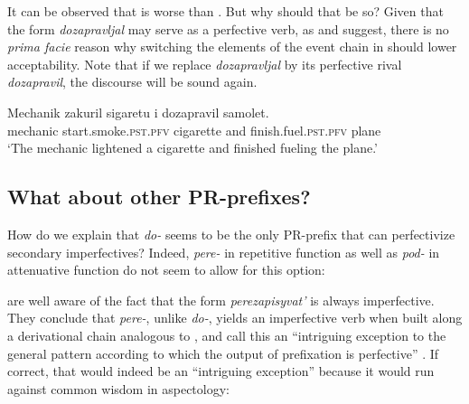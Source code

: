 \documentclass[output=paper,
colorlinks,
citecolor=brown,
newtxmath
]{langscibook}
\begin{document}
\noindent It can be observed that  is worse than . But why should that be so? Given that the form \textit{dozapravljal} may serve as a perfective verb, as \citet{Zinova.Filip2015} and \citet{Zinova2016} suggest, there is no \textit{prima facie} reason why switching the elements of the event chain in  should lower acceptability. Note that if we replace \textit{dozapravljal} by its perfective rival \textit{dozapravil}, the discourse will be sound again.

\ea\label{machaplus}
\gll Mechanik zakuril sigaretu i dozapravil samolet.\\
mechanic {start.smoke.}\textsc{pst.pfv} cigarette and {finish.fuel.}\textsc{pst.pfv} plane\\
\glt `The mechanic lightened a cigarette and finished fueling the plane.'
\z


\subsection{What about other PR-prefixes?}\label{popopo}

How do we explain that \textit{do-} seems to be the only PR-prefix that can perfectivize secondary imperfectives? Indeed, \textit{pere-} in repetitive function as well as \textit{pod-} in attenuative function do not seem to allow for this option:

\z

\noindent \citet{Zinova.Filip2015} are well aware of the fact that the form \textit{perezapisyvat'} is always imperfective. They conclude that \textit{pere-}, unlike \textit{do-}, yields an imperfective verb when built along a derivational chain analogous to , and call this an ``intriguing exception to the general pattern according to which the output of prefixation is perfective'' \citep[605]{Zinova.Filip2015}. If correct, that would indeed be an ``intriguing exception'' because it would run against common wisdom in  aspectology:\largerpage[-1]
\end{document}

